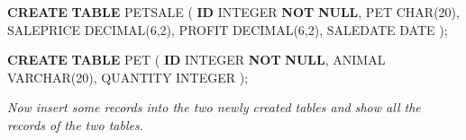 \documentclass[
]{book}
\newenvironment{Shaded}{\begin{snugshade}}{\end{snugshade}}
\newcommand{\DataTypeTok}[1]{\textcolor[rgb]{0.13,0.29,0.53}{#1}}
\newcommand{\DecValTok}[1]{\textcolor[rgb]{0.00,0.00,0.81}{#1}}
\newcommand{\KeywordTok}[1]{\textcolor[rgb]{0.13,0.29,0.53}{\textbf{#1}}}
\newcommand{\NormalTok}[1]{#1}
\begin{document}
\begin{Shaded}
\begin{Highlighting}[]
\KeywordTok{CREATE} \KeywordTok{TABLE}\NormalTok{ PETSALE (}
    \KeywordTok{ID} \DataTypeTok{INTEGER} \KeywordTok{NOT} \KeywordTok{NULL}\NormalTok{,}
\NormalTok{    PET }\DataTypeTok{CHAR}\NormalTok{(}\DecValTok{20}\NormalTok{),}
\NormalTok{    SALEPRICE }\DataTypeTok{DECIMAL}\NormalTok{(}\DecValTok{6}\NormalTok{,}\DecValTok{2}\NormalTok{),}
\NormalTok{    PROFIT }\DataTypeTok{DECIMAL}\NormalTok{(}\DecValTok{6}\NormalTok{,}\DecValTok{2}\NormalTok{),}
\NormalTok{    SALEDATE }\DataTypeTok{DATE}
\NormalTok{    );}
    
\KeywordTok{CREATE} \KeywordTok{TABLE}\NormalTok{ PET (}
    \KeywordTok{ID} \DataTypeTok{INTEGER} \KeywordTok{NOT} \KeywordTok{NULL}\NormalTok{,}
\NormalTok{    ANIMAL }\DataTypeTok{VARCHAR}\NormalTok{(}\DecValTok{20}\NormalTok{),}
\NormalTok{    QUANTITY }\DataTypeTok{INTEGER}
\NormalTok{    );}
\end{Highlighting}
\end{Shaded}

{\emph{Now insert some records into the two newly created tables and show all the records of the two tables. }}
\end{document}
